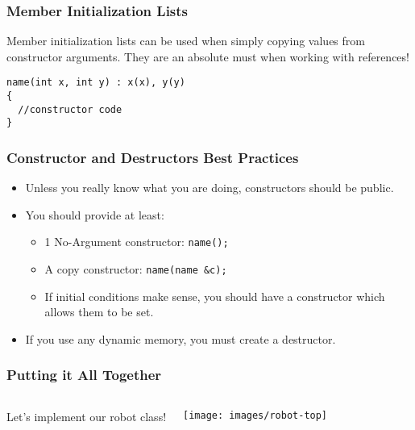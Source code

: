 \documentclass[handout]{beamer}
\begin{document}
\begin{frame}[fragile]
   \frametitle{Member Initialization Lists}
   Member initialization lists can be used when simply copying values
   from constructor arguments.  They are an absolute must when working
   with references!
   \begin{verbatim}
name(int x, int y) : x(x), y(y)
{
  //constructor code
}
   \end{verbatim}
\end{frame}

\begin{frame}
   \frametitle{Constructor and Destructors Best Practices}
   \begin{itemize}
   \item Unless you really know what you are doing, constructors 
     should be public.
   \item You should provide at least:
   \begin{itemize}
     \item 1 No-Argument constructor: {\tt name(); }
     \item A copy constructor: {\tt name(name \&c); }
     \item If initial conditions make sense, you should have a constructor
       which allows them to be set.
   \end{itemize}
   \item If you use any dynamic memory, you must create a destructor.
   \end{itemize}
\end{frame}

\begin{frame}
   \frametitle{Putting it All Together}
   \begin{columns}
   Let's implement our robot class!
   
   \texttt{[image: images/robot-top]}
   \end{columns}
\end{frame}
\end{document}
